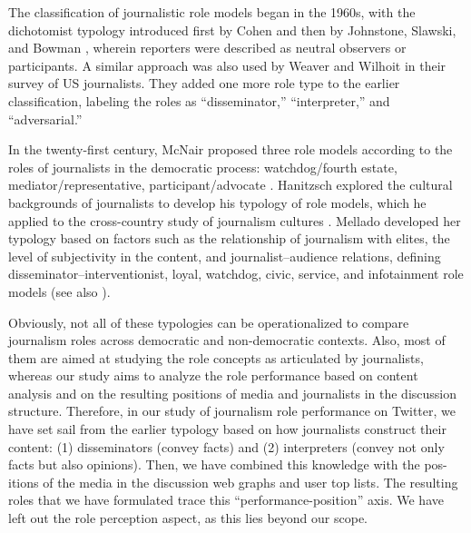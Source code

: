 The classification of journalistic role models began in the 1960s, with the dichotomist typology introduced first by Cohen \cite{Cohen} and then by Johnstone, Slawski, and Bowman \cite{JohnstoneSlawskiBowman}, wherein reporters were described as neutral observers or participants. A similar approach was also used by Weaver and Wilhoit \cite{WeaverWilhoit,WeaverWilhoit1996} in their survey of US journalists. They added one more role type to the earlier classification, labeling the roles as “disseminator,” “interpreter,” and “adversarial.”

In the twenty-first century, McNair proposed three role models according to the roles of journalists in the democratic process: watchdog/fourth estate, mediator/representative, participant/advocate \cite{McNair}. Hanitzsch \cite{Hanitzsch} explored the cultural backgrounds of journalists to develop his typology of role models, which he applied to the cross-country study of journalism cultures \cite{HanitzschHanuschMellado}. Mellado \cite{Mellado} developed her typology based on factors such as the relationship of journalism with elites, the level of subjectivity in the content, and journalist–audience relations, defining disseminator–interventionist, loyal, watchdog, civic, service, and infotainment role models (see also \cite{MelladoLagos}).

Obviously, not all of these typologies can be operationalized to compare journalism roles across democratic and non-democratic contexts. Also, most of them are aimed at studying the role concepts as articulated by journalists, whereas our study aims to analyze the role performance based on content analysis and on the resulting positions of media and journalists in the discussion structure. Therefore, in our study of journalism role performance on Twitter, we have set sail from the earlier typology based on how journalists construct their content: (1) disseminators (convey facts) and (2) interpreters (convey not only facts but also opinions). Then, we have combined this knowledge with the pos- itions of the media in the discussion web graphs and user top lists. The resulting roles that we have formulated trace this “performance-position” axis. We have left out the role perception aspect, as this lies beyond our scope.

